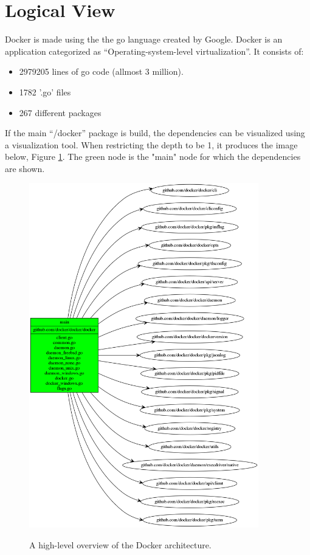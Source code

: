 
\section{Logical View}
\label{sec:viewlogical}


Docker is made using the the go language created by Google. Docker is an application categorized as ``Operating-system-level virtualization''. It consists of:
\begin{itemize}
\item 2979205 lines of go code (allmost 3 million).
\item 1782 '.go' files
\item 267 different packages
\end{itemize}

If the main ``/docker'' package is build, the dependencies can be visualized using a  visualization tool. When restricting the depth to be 1, it produces the image below, Figure \ref{fig:dockerdep1}. The green node is the "main" node for which the dependencies are shown.

\begin{figure}[H]
\caption{A high-level overview of the Docker architecture.}
\centering
\includegraphics[width=\linewidth, height=15cm]{images/dependencyGraphs/goviz/govizgreendocker1.png}
\label{fig:dockerdep1}
\end{figure}

